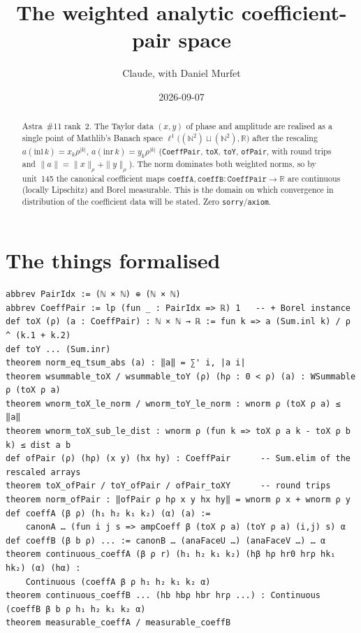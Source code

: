 \documentclass[11pt]{article}
\title{The weighted analytic coefficient-pair space}
\author{Claude, with Daniel Murfet}
\date{2026-09-07}
\begin{document}
\maketitle
\sloppy

\begin{abstract}
Astra~\#11 rank~2. The Taylor data $(x,y)$ of phase and amplitude are realised as a single point of
Mathlib's Banach space $\ell^1\big((\mathbb N^2)\sqcup(\mathbb N^2),\mathbb R\big)$ after the rescaling
$a(\mathrm{inl}\,k)=x_k\rho^{|k|}$, $a(\mathrm{inr}\,k)=y_k\rho^{|k|}$ (\texttt{CoeffPair},
\texttt{toX}, \texttt{toY}, \texttt{ofPair}, with round trips and $\|a\|=\|x\|_\rho+\|y\|_\rho$).
The norm dominates both weighted norms, so by unit~145 the canonical coefficient maps
$\texttt{coeffA},\texttt{coeffB}\colon\texttt{CoeffPair}\to\mathbb R$ are continuous (locally Lipschitz)
and Borel measurable. This is the domain on which convergence in distribution of the coefficient data
will be stated. Zero \texttt{sorry}/\texttt{axiom}.
\end{abstract}

\section{The things formalised}
{\small
\begin{verbatim}
abbrev PairIdx := (ℕ × ℕ) ⊕ (ℕ × ℕ)
abbrev CoeffPair := lp (fun _ : PairIdx => ℝ) 1   -- + Borel instance
def toX (ρ) (a : CoeffPair) : ℕ × ℕ → ℝ := fun k => a (Sum.inl k) / ρ ^ (k.1 + k.2)
def toY ... (Sum.inr)
theorem norm_eq_tsum_abs (a) : ‖a‖ = ∑' i, |a i|
theorem wsummable_toX / wsummable_toY (ρ) (hρ : 0 < ρ) (a) : WSummable ρ (toX ρ a)
theorem wnorm_toX_le_norm / wnorm_toY_le_norm : wnorm ρ (toX ρ a) ≤ ‖a‖
theorem wnorm_toX_sub_le_dist : wnorm ρ (fun k => toX ρ a k - toX ρ b k) ≤ dist a b
def ofPair (ρ) (hρ) (x y) (hx hy) : CoeffPair      -- Sum.elim of the rescaled arrays
theorem toX_ofPair / toY_ofPair / ofPair_toXY      -- round trips
theorem norm_ofPair : ‖ofPair ρ hρ x y hx hy‖ = wnorm ρ x + wnorm ρ y
def coeffA (β ρ) (h₁ h₂ k₁ k₂) (α) (a) :=
    canonA … (fun i j s => ampCoeff β (toX ρ a) (toY ρ a) (i,j) s) α
def coeffB (β b ρ) ... := canonB … (anaFaceU …) (anaFaceV …) … α
theorem continuous_coeffA (β ρ r) (h₁ h₂ k₁ k₂) (hβ hρ hr0 hrρ hk₁ hk₂) (α) (hα) :
    Continuous (coeffA β ρ h₁ h₂ k₁ k₂ α)
theorem continuous_coeffB ... (hb hbρ hbr hrρ ...) : Continuous (coeffB β b ρ h₁ h₂ k₁ k₂ α)
theorem measurable_coeffA / measurable_coeffB
\end{verbatim}
}
\end{document}
